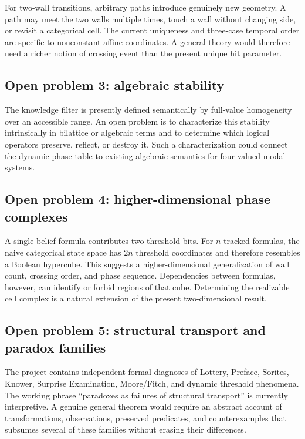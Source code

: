For two-wall transitions, arbitrary paths introduce genuinely new geometry. A path may meet the two walls multiple times, touch a wall without changing side, or revisit a categorical cell. The current uniqueness and three-case temporal order are specific to nonconstant affine coordinates. A general theory would therefore need a richer notion of crossing event than the present unique hit parameter.

\subsection{Open problem 3: algebraic stability}

The knowledge filter is presently defined semantically by full-value homogeneity over an accessible range. An open problem is to characterize this stability intrinsically in bilattice or algebraic terms and to determine which logical operators preserve, reflect, or destroy it. Such a characterization could connect the dynamic phase table to existing algebraic semantics for four-valued modal systems.

\subsection{Open problem 4: higher-dimensional phase complexes}

A single belief formula contributes two threshold bits. For \(n\) tracked formulas, the naive categorical state space has \(2n\) threshold coordinates and therefore resembles a Boolean hypercube. This suggests a higher-dimensional generalization of wall count, crossing order, and phase sequence. Dependencies between formulas, however, can identify or forbid regions of that cube. Determining the realizable cell complex is a natural extension of the present two-dimensional result.

\subsection{Open problem 5: structural transport and paradox families}

The project contains independent formal diagnoses of Lottery, Preface, Sorites, Knower, Surprise Examination, Moore/Fitch, and dynamic threshold phenomena. The working phrase ``paradoxes as failures of structural transport'' is currently interpretive. A genuine general theorem would require an abstract account of transformations, observations, preserved predicates, and counterexamples that subsumes several of these families without erasing their differences.
